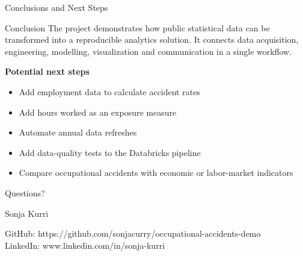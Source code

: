 \documentclass[aspectratio=169]{beamer}
\begin{document}
\begin{frame}{Conclusions and Next Steps}

\begin{block}{Conclusion}
The project demonstrates how public statistical data can be transformed
into a reproducible analytics solution. It connects data acquisition,
engineering, modelling, visualization and communication in a single workflow.
\end{block}

\vspace{0.3cm}

\textbf{Potential next steps}

\begin{itemize}
    \item Add employment data to calculate accident rates
    \item Add hours worked as an exposure measure
    \item Automate annual data refreshes
    \item Add data-quality tests to the Databricks pipeline
    \item Compare occupational accidents with economic or labor-market indicators
\end{itemize}

\end{frame}

\begin{frame}
    \centering
    \Huge Questions?

    \vspace{0.8cm}

    \large
    Sonja Kurri

    \vspace{0.3cm}

    \normalsize
    GitHub: \alert{https://github.com/sonjacurry/occupational-accidents-demo}\\
    LinkedIn: \alert{www.linkedin.com/in/sonja-kurri}
\end{frame}
\end{document}
